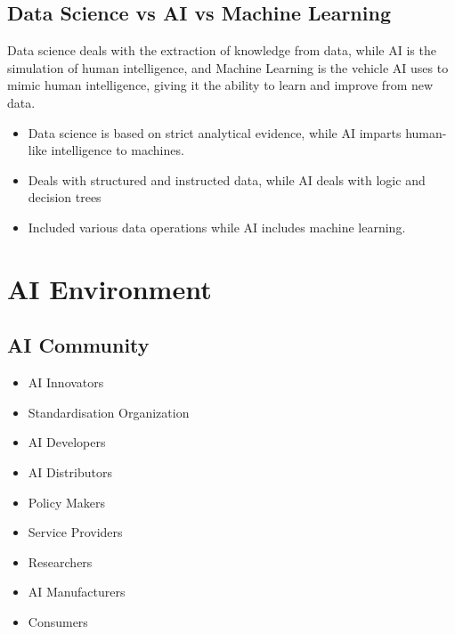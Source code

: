 \documentclass[12pt letter]{report}
\begin{document}


\subsection{Data Science vs AI vs Machine Learning}

Data science deals with the extraction of knowledge from data, while AI is the simulation of human intelligence, and
Machine Learning is the vehicle AI uses to mimic human intelligence, giving it the ability to learn and improve from new
data.
\begin{itemize}
  \item Data science is based on strict analytical evidence, while AI imparts human-like intelligence to machines.
  \item Deals with structured and instructed data, while AI deals with logic and decision trees
  \item Included various data operations while AI includes machine learning.
\end{itemize}

\section{AI Environment}

\subsection{AI Community}

\begin{itemize}
  \item AI Innovators
  \item Standardisation Organization
  \item AI Developers
  \item AI Distributors
  \item Policy Makers
  \item Service Providers
  \item Researchers
  \item AI Manufacturers
  \item Consumers
\end{itemize}
\end{document}

